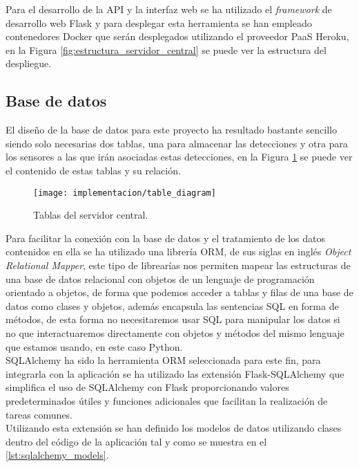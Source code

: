 \documentclass[../proyecto.tex]{subfiles}
\begin{document}
Para el desarrollo de la API y la interfaz web se ha utilizado el \textit{framework} de desarrollo web Flask y para desplegar esta herramienta se han empleado contenedores Docker que serán desplegados utilizando el proveedor PaaS Heroku, en la Figura \ref{fig:estructura_servidor_central} se puede ver la estructura del despliegue.\\

\subsection{Base de datos}

El diseño de la base de datos para este proyecto ha resultado bastante sencillo siendo solo necesarias dos tablas, una para almacenar las detecciones y otra para los sensores a las que irán asociadas estas detecciones, en la Figura \ref{fig:table_diagram} se puede ver el contenido de estas tablas y su relación.

\begin{figure}[H]
\centering
\texttt{[image: implementacion/table\_diagram]}
\caption{Tablas del servidor central.}
\label{fig:table_diagram}
\end{figure}

Para facilitar la conexión con la base de datos y el tratamiento de los datos contenidos en ella se ha utilizado una librería ORM, de sus siglas en inglés \textit{Object Relational Mapper}, este tipo de librearías nos permiten mapear las estructuras de una base de datos relacional con objetos de un lenguaje de programación orientado a objetos, de forma que podemos acceder a tablas y filas de una base de datos como clases y objetos, además encapsula las sentencias SQL en forma de métodos, de esta forma no necesitaremos usar SQL para manipular los datos si no que interactuaremos directamente con objetos y métodos del mismo lenguaje que estamos usando, en este caso Python.\\

SQLAlchemy \cite{sqlalchemy} ha sido la herramienta ORM seleccionada para este fin, para integrarla con la aplicación se ha utilizado las extensión Flask-SQLAlchemy \cite{flask_sqlalchemy} que simplifica el uso de SQLAlchemy con Flask proporcionando valores predeterminados útiles y funciones adicionales que facilitan la realización de tareas comunes.\\

Utilizando esta extensión se han definido los modelos de datos utilizando clases dentro del código de la aplicación tal y como se muestra en el \autoref{lst:sqlalchemy_models}.\\
\end{document}
